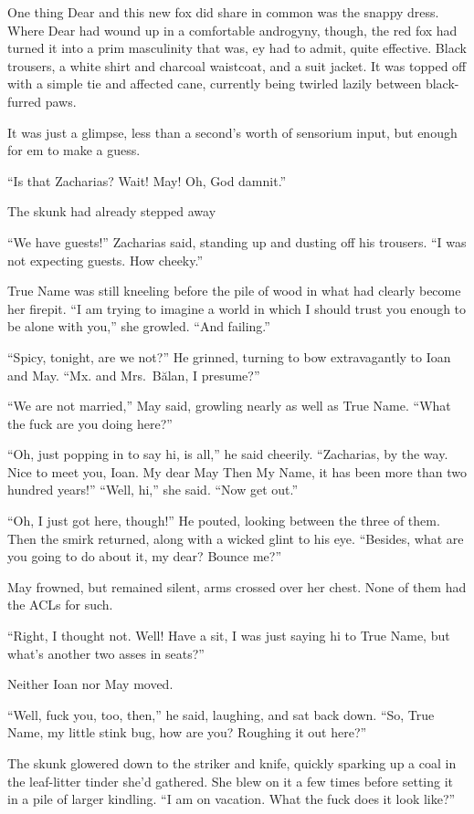 One thing Dear and this new fox did share in common was the snappy dress. Where Dear had wound up in a comfortable androgyny, though, the red fox had turned it into a prim masculinity that was, ey had to admit, quite effective. Black trousers, a white shirt and charcoal waistcoat, and a suit jacket. It was topped off with a simple tie and affected cane, currently being twirled lazily between black-furred paws.

It was just a glimpse, less than a second's worth of sensorium input, but enough for em to make a guess.

``Is that Zacharias? Wait! May! Oh, God damnit.''

The skunk had already stepped away

``We have guests!'' Zacharias said, standing up and dusting off his trousers. ``I was not expecting guests. How cheeky.''

True Name was still kneeling before the pile of wood in what had clearly become her firepit. ``I am trying to imagine a world in which I should trust you enough to be alone with you,'' she growled. ``And failing.''

``Spicy, tonight, are we not?'' He grinned, turning to bow extravagantly to Ioan and May. ``Mx. and Mrs.~Bălan, I presume?''

``We are not married,'' May said, growling nearly as well as True Name. ``What the fuck are you doing here?''

``Oh, just popping in to say hi, is all,'' he said cheerily. ``Zacharias, by the way. Nice to meet you, Ioan. My dear May Then My Name, it has been more than two hundred years!'' ``Well, hi,'' she said. ``Now get out.''

``Oh, I just got here, though!'' He pouted, looking between the three of them. Then the smirk returned, along with a wicked glint to his eye. ``Besides, what are you going to do about it, my dear? Bounce me?''

May frowned, but remained silent, arms crossed over her chest. None of them had the ACLs for such.

``Right, I thought not. Well! Have a sit, I was just saying hi to True Name, but what's another two asses in seats?''

Neither Ioan nor May moved.

``Well, fuck you, too, then,'' he said, laughing, and sat back down. ``So, True Name, my little stink bug, how are you? Roughing it out here?''

The skunk glowered down to the striker and knife, quickly sparking up a coal in the leaf-litter tinder she'd gathered. She blew on it a few times before setting it in a pile of larger kindling. ``I am on vacation. What the fuck does it look like?''

